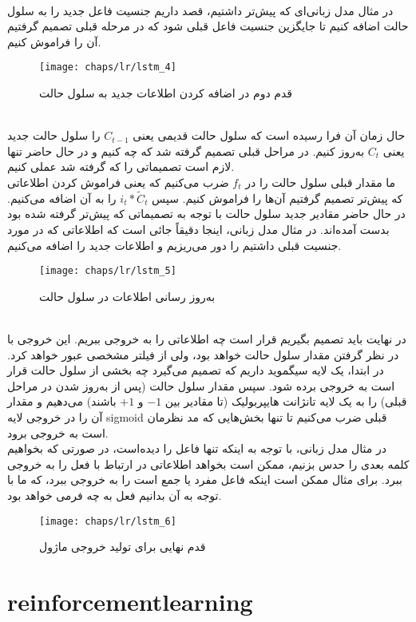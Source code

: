 \\
در مثال مدل زبانی‌ای که پیش‌تر داشتیم، قصد داریم جنسیت فاعل جدید را به سلول حالت اضافه کنیم تا جایگزین جنسیت فاعل قبلی شود که در مرحله قبلی تصمیم گرفتیم آن را فراموش کنیم.
 \begin{figure}[!ht]
	\centerline{\texttt{[image: chaps/lr/lstm\_4]}}
	\caption{
		قدم دوم در اضافه کردن اطلاعات جدید به سلول حالت
	}
	\label{fig:ch_lr:lstm_4}
\end{figure} 
\\
حال زمان آن فرا رسیده است که سلول حالت قدیمی یعنی $C_{t-1}$ را سلول حالت جدید یعنی $C_t$ به‌روز کنیم. در مراحل قبلی تصمیم گرفته شد که چه کنیم و در حال حاضر تنها لازم است تصمیماتی را که گرفته شد عملی کنیم.
\\
ما مقدار قبلی سلول حالت را در $f_t$ ضرب می‌کنیم که یعنی فراموش کردن اطلاعاتی که پیش‌تر تصمیم گرفتیم آن‌ها را فراموش کنیم. سپس $i_t \ast \tilde{C}_t$ را به آن اضافه می‌کنیم. در حال حاضر مقادیر جدید سلول حالت با توجه به تصمیماتی که پیش‌تر گرفته شده بود بدست آمده‌اند. در مثال مدل زبانی، اینجا دقیقاً جائی است که اطلاعاتی که در مورد جنسیت قبلی داشتیم را دور می‌ریزیم و اطلاعات جدید را اضافه می‌کنیم.
 \begin{figure}[!ht]
	\centerline{\texttt{[image: chaps/lr/lstm\_5]}}
	\caption{
		به‌روز رسانی اطلاعات در سلول حالت
	}
	\label{fig:ch_lr:lstm_5}
\end{figure} 
\\
در نهایت باید تصمیم بگیریم قرار است چه اطلاعاتی را به خروجی ببریم. این خروجی با در نظر گرفتن مقدار سلول حالت خواهد بود، ولی از فیلتر مشخصی عبور خواهد کرد. در ابتدا، یک لایه سیگموید داریم که تصمیم می‌گیرد چه بخشی از سلول حالت قرار است به خروجی برده شود. سپس مقدار سلول حالت (پس از به‌روز شدن در مراحل قبلی) را به یک لایه تانژانت هایپربولیک (تا مقادیر بین $-1$ و $+1$ باشند) می‌دهیم و مقدار آن را در خروجی لایه \gls{sigmoid} قبلی ضرب می‌کنیم تا تنها بخش‌هایی که مد نظرمان است به خروجی برود.
\\
در مثال مدل زبانی، با توجه به اینکه تنها فاعل را دیده‌است، در صورتی که بخواهیم کلمه بعدی را حدس بزنیم، ممکن است بخواهد اطلاعاتی در ارتباط با فعل را به خروجی ببرد. برای مثال ممکن است اینکه فاعل مفرد یا جمع است را به خروجی ببرد، که ما با توجه به آن بدانیم فعل به چه فرمی خواهد بود.
 \begin{figure}[!ht]
	\centerline{\texttt{[image: chaps/lr/lstm\_6]}}
	\caption{
		قدم نهایی برای تولید خروجی ماژول 
	}
	\label{fig:ch_lr:lstm_6}
\end{figure} 
 
 \section{\gls{reinforcementlearning}}
 

